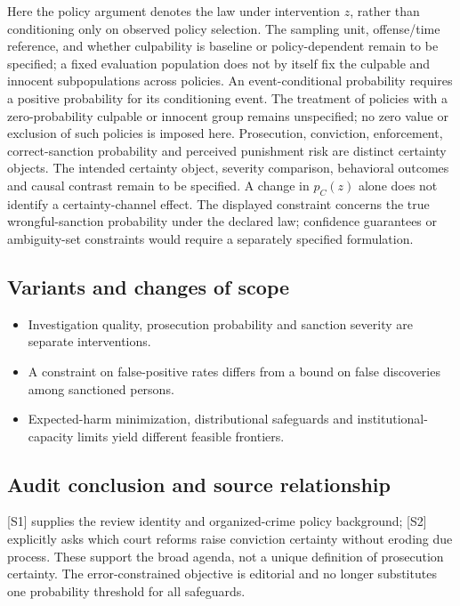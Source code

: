 \documentclass[11pt,a4paper]{article}
\begin{document}
Here the policy argument denotes the law under intervention \(z\), rather than conditioning only on observed policy selection. The sampling unit, offense/time reference, and whether culpability is baseline or policy-dependent remain to be specified; a fixed evaluation population does not by itself fix the culpable and innocent subpopulations across policies. An event-conditional probability requires a positive probability for its conditioning event. The treatment of policies with a zero-probability culpable or innocent group remains unspecified; no zero value or exclusion of such policies is imposed here. Prosecution, conviction, enforcement, correct-sanction probability and perceived punishment risk are distinct certainty objects. The intended certainty object, severity comparison, behavioral outcomes and causal contrast remain to be specified. A change in \(p_C(z)\) alone does not identify a certainty-channel effect. The displayed constraint concerns the true wrongful-sanction probability under the declared law; confidence guarantees or ambiguity-set constraints would require a separately specified formulation.

\subsection*{Variants and changes of scope}

\begin{itemize}
\item Investigation quality, prosecution probability and sanction severity are separate interventions.
\item A constraint on false-positive rates differs from a bound on false discoveries among sanctioned persons.
\item Expected-harm minimization, distributional safeguards and institutional-capacity limits yield different feasible frontiers.
\end{itemize}

\subsection*{Audit conclusion and source relationship}

[S1] supplies the review identity and organized-crime policy background; [S2] explicitly asks which court reforms raise conviction certainty without eroding due process. These support the broad agenda, not a unique definition of prosecution certainty. The error-constrained objective is editorial and no longer substitutes one probability threshold for all safeguards.
\end{document}
